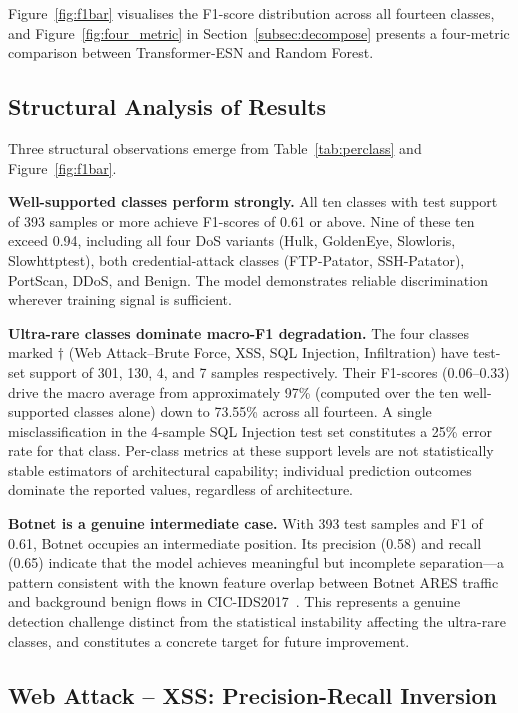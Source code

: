\documentclass[5p,times]{elsarticle}
\begin{document}
	Figure~\ref{fig:f1bar} visualises the F1-score distribution across
	all fourteen classes, and Figure~\ref{fig:four_metric} in
	Section~\ref{subsec:decompose} presents a four-metric comparison
	between Transformer-ESN and Random Forest.
	
	\subsection{Structural Analysis of Results}
	\label{subsec:structural}
	
	Three structural observations emerge from Table~\ref{tab:perclass}
	and Figure~\ref{fig:f1bar}.
	
	\textbf{Well-supported classes perform strongly.}
	All ten classes with test support of 393 samples or more achieve
	F1-scores of 0.61 or above. Nine of these ten exceed 0.94, including
	all four DoS variants (Hulk, GoldenEye, Slowloris, Slowhttptest),
	both credential-attack classes (FTP-Patator, SSH-Patator), PortScan,
	DDoS, and Benign. The model demonstrates reliable discrimination
	wherever training signal is sufficient.
	
	\textbf{Ultra-rare classes dominate macro-F1 degradation.}
	The four classes marked $\dagger$ (Web Attack--Brute Force, XSS, SQL
	Injection, Infiltration) have test-set support of 301, 130, 4, and 7
	samples respectively. Their F1-scores (0.06--0.33) drive the macro
	average from approximately 97\% (computed over the ten well-supported
	classes alone) down to 73.55\% across all fourteen. A single
	misclassification in the 4-sample SQL Injection test set constitutes
	a 25\% error rate for that class. Per-class metrics at these support
	levels are not statistically stable estimators of architectural
	capability; individual prediction outcomes dominate the reported
	values, regardless of architecture.
	
	\textbf{Botnet is a genuine intermediate case.}
	With 393 test samples and F1 of 0.61, Botnet occupies an intermediate
	position. Its precision (0.58) and recall (0.65) indicate that the
	model achieves meaningful but incomplete separation---a pattern
	consistent with the known feature overlap between Botnet ARES traffic
	and background benign flows in CIC-IDS2017~\cite{cicids2017}. This
	represents a genuine detection challenge distinct from the statistical
	instability affecting the ultra-rare classes, and constitutes a
	concrete target for future improvement.
	
	\subsection{Web Attack -- XSS: Precision-Recall Inversion}
	\label{subsec:xss}
	
\end{document}
